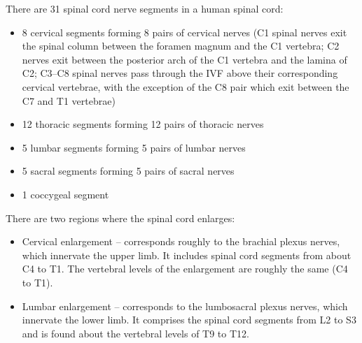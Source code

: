 \documentclass[]{book}
\providecommand{\tightlist}{%
  \setlength{\itemsep}{0pt}\setlength{\parskip}{0pt}}
\begin{document}
There are 31 spinal cord nerve segments in a human spinal cord:

\begin{itemize}
\tightlist
\item
  8 cervical segments forming 8 pairs of cervical nerves (C1 spinal nerves exit the spinal column between the foramen magnum and the C1 vertebra; C2 nerves exit between the posterior arch of the C1 vertebra and the lamina of C2; C3--C8 spinal nerves pass through the IVF above their corresponding cervical vertebrae, with the exception of the C8 pair which exit between the C7 and T1 vertebrae)
\item
  12 thoracic segments forming 12 pairs of thoracic nerves
\item
  5 lumbar segments forming 5 pairs of lumbar nerves
\item
  5 sacral segments forming 5 pairs of sacral nerves
\item
  1 coccygeal segment
\end{itemize}

There are two regions where the spinal cord enlarges:

\begin{itemize}
\tightlist
\item
  Cervical enlargement -- corresponds roughly to the brachial plexus nerves, which innervate the upper limb. It includes spinal cord segments from about C4 to T1. The vertebral levels of the enlargement are roughly the same (C4 to T1).
\item
  Lumbar enlargement -- corresponds to the lumbosacral plexus nerves, which innervate the lower limb. It comprises the spinal cord segments from L2 to S3 and is found about the vertebral levels of T9 to T12.
\end{itemize}
\end{document}
